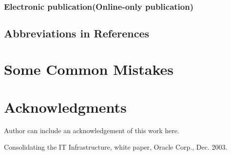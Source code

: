 \documentclass[11pt, onecolumn, twoside, a4paper]{article}
\begin{document}
\subsubsection{Electronic publication(Online-only publication)}
\subsection{Abbreviations in References}





\section{Some Common Mistakes}



\section*{Acknowledgments}

Author can include an acknowledgement of this work here. 


\begin{thebibliography}{9}

 Consolidating the IT Infrastructure, white paper, Oracle Corp., Dec. 2003.
\end{thebibliography}
\end{document}
